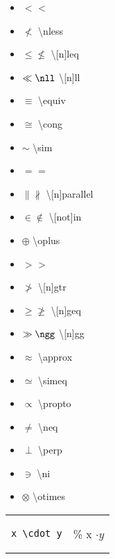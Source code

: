 \begin{minipage}{3cm}
\begin{itemize}[label={}]
    \item $<$ <
    \item $\nless$ \textbackslash nless
    \item $\leq\nleq$ \textbackslash [n]leq 
    \item $\ll\nll$ \textbackslash [n]ll
    \item $\equiv$ \textbackslash equiv 
    \item $\cong$ \textbackslash cong 
    \item $\sim$ \textbackslash sim 
    \item $=$ = 
    \item $\parallel\nparallel$ \textbackslash [n]parallel 
    \item $\in\notin$ \textbackslash [not]in 
    \item $\oplus$ \textbackslash oplus 
\end{itemize} 
\end{minipage}
\begin{minipage}{3cm}
\begin{itemize}[label={}]
    \item $>$ >
    \item $\ngtr$ \textbackslash [n]gtr
    \item $\geq\ngeq$ \textbackslash [n]geq 
    \item $\gg\ngg$ \textbackslash [n]gg
    \item $\approx$ \textbackslash approx
    \item $\simeq$ \textbackslash simeq 
    \item $\propto$ \textbackslash propto
    \item $\neq$ \textbackslash neq 
    \item $\perp$ \textbackslash perp
    \item $\ni$ \textbackslash ni 
    \item $\otimes$ \textbackslash otimes
\end{itemize} 
\end{minipage}

\begin{tabular}{l l}
\begin{lstlisting}
x \cdot y
\end{lstlisting}
& \% x $\cdot y$ \\
\end{tabular}


